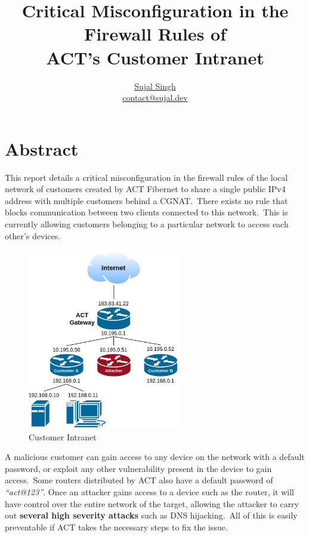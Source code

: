 \documentclass[11pt]{article}
\title{\textbf{Critical Misconfiguration in the Firewall Rules of \\ ACT's Customer Intranet}}
\author{\href{https://github.com/sujaldev}{Sujal Singh} \\ \href{mailto:contact@sujal.dev}{contact@sujal.dev}}
\date{}
\begin{document}
    \maketitle

    \section*{Abstract}
    This report details a critical misconfiguration in the firewall rules of the local network of customers created by
    ACT Fibernet to share a single public IPv4 address with multiple customers behind a CGNAT.\ There exists no rule
    that blocks communication between two clients connected to this network.\ This is currently allowing customers
    belonging to a particular network to access each other's devices.

    \begin{figure}[!htb]
        \centering
        \includegraphics[width=190pt]{./diagrams/network-hierarchy}
        \caption{Customer Intranet}
        \label{fig:1}
    \end{figure}

    A malicious customer can gain access to any device on the network with a default password, or exploit any other
    vulnerability present in the device to gain access.\ Some routers distributed by ACT also have a default password
    of \emph{``act@123''}{.} Once an attacker gains access to a device such as the router, it will have control over
    the entire network of the target, allowing the attacker to carry out \textbf{several high severity attacks} such as
    DNS hijacking.\ All of this is easily preventable if ACT takes the necessary steps to fix the issue.
\end{document}
